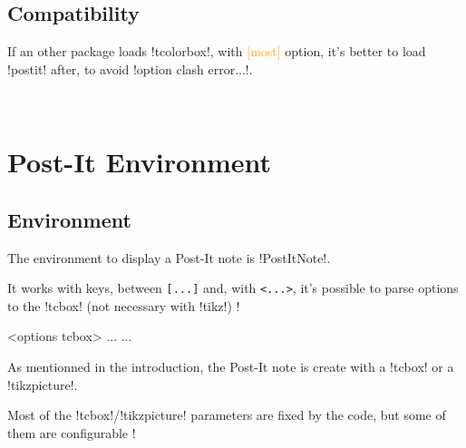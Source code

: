 \documentclass[english,a4paper,11pt]{article}
\newcommand\Cle[1]{{\small\sffamily\textlangle \textcolor{orange}{#1}\textrangle}}
\begin{document}
\subsection{Compatibility}

\begin{cautionblock}
If an other package loads \packagetex!tcolorbox!, with \Cle{[most]} option, it's better to load \packagetex!postit! after, to avoid \motcletex!option clash error...!.
\end{cautionblock}


\vfill~

\pagebreak

\section{Post-It Environment}

\subsection{Environment}

\begin{cautionblock}
The environment to display a Post-It note is \packagetex!PostItNote!.

It works with keys, between \texttt{[...]} and, with \texttt{<...>}, it's possible to parse options to  the \motcletex!tcbox! (not necessary with \motcletex!tikz!) !
\end{cautionblock}

\begin{DemoCode}
\begin{PostIt}[keys]<options tcbox>
...
...
\end{PostIt}
\end{DemoCode}

\begin{noteblock}
As mentionned in the introduction, the Post-It note is create with a \motcletex!tcbox! or a  \motcletex!tikzpicture!.

Most of the \motcletex!tcbox!/\motcletex!tikzpicture! parameters are fixed by the code, but some of them are configurable !
\end{noteblock}

\begin{DemoCode}[]
\begin{PostItNote}
\lipsum[1][1-2]
\end{PostItNote}
\end{DemoCode}
\end{document}
